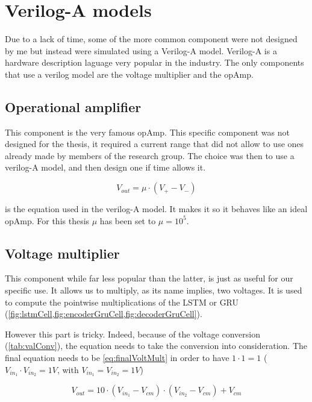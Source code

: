 \section{Verilog-A models}
\label{sec:models}

Due to a lack of time, some of the more common component were not designed by me but instead were simulated using a Verilog-A model. Verilog-A is a hardware description laguage very popular in the industry. The only components that use a verilog model are the voltage multiplier and the \ac{opAmp}.

\subsection{Operational amplifier}\label{subsec:opamp}

This component is the very famous \ac{opAmp}. This specific component was not designed for the thesis, it required a current range that did not allow to use ones already made by members of the research group. The choice was then to use a verilog-A model, and then design one if time allows it.

\begin{equation}
  \label{eq:opAmp}
  V_{out}=\mu \cdot (V_+-V_-)
\end{equation}

 is the equation used in the verilog-A model. It makes it so it behaves like an ideal \ac{opAmp}. For this thesis $\mu$ has been set to $\mu=10^5$.

\subsection{Voltage multiplier}\label{subsec:voltmult}

This component while far less popular than the latter, is just as useful for our specific use. It allows us to multiply, as its name implies, two voltages. It is used to compute the pointwise multiplications of the \ac{LSTM} or \ac{GRU} (\cref{fig:lstmCell,fig:encoderGruCell,fig:decoderGruCell}).

However this part is tricky. Indeed, because of the voltage conversion (\cref{tab:valConv}), the equation needs to take the conversion into consideration. The final equation needs to be \cref{eq:finalVoltMult} in order to have $1\cdot 1=1$ ($V_{in_1}\cdot V_{in_2}=1V$, with $V_{in_1}=V_{in_2}=1V$)

\begin{equation}\label{eq:finalVoltMult}
  V_{out}=10\cdot(V_{in_1}-V_{cm})\cdot (V_{in_2}-V_{cm}) + V_{cm}
\end{equation}

